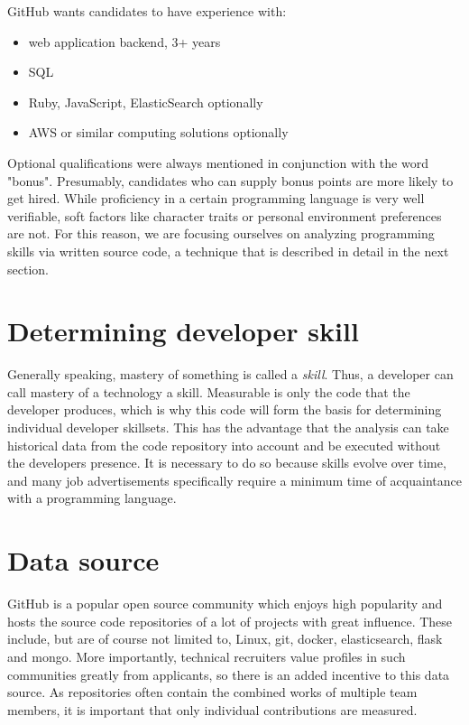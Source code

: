 GitHub wants candidates to have experience with:
\begin{itemize}
    \item web application backend, 3+ years
    \item SQL
    \item Ruby, JavaScript, ElasticSearch optionally
    \item AWS or similar computing solutions optionally
\end{itemize}

Optional qualifications were always mentioned in conjunction with the word "bonus". Presumably, candidates who can supply bonus points are more likely to get hired. While proficiency in a certain programming language is very well verifiable, soft factors like character traits or personal environment preferences are not. For this reason, we are focusing ourselves on analyzing programming skills via written source code, a technique that is described in detail in the next section.

\section{Determining developer skill}
Generally speaking, mastery of something is called a \textit{skill}. Thus, a developer can call mastery of a technology a skill. Measurable is only the code that the developer produces, which is why this code will form the basis for determining individual developer skillsets. This has the advantage that the analysis can take historical data from the code repository into account and be executed without the developers presence. It is necessary to do so because skills evolve over time, and many job advertisements specifically require a minimum time of acquaintance with a programming language.

\section{Data source}
GitHub is a popular open source community which enjoys high popularity
and hosts the source code repositories of a lot of projects with great influence. These include, but are of course not limited to, Linux, git, docker, elasticsearch, flask and mongo\cite{rpfd:2014}. More importantly, technical recruiters value profiles in such communities greatly from applicants\cite{md:2013}, so there is an added incentive to this data source. As repositories often contain the combined works of multiple team members, it is important that only individual contributions are measured.

